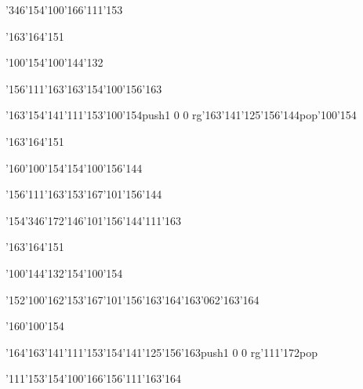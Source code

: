 \null\vfill\ipa\centerline{\enskip\enskip\enskip\enskip\enskip\enskip\enskip\enskip\enskip\enskip\enskip\enskip\enskip}\medskip\centerline{\enskip\char'346\enskip\char'154\char'100\char'166\enskip\enskip\enskip\enskip\enskip\enskip\char'111\char'153}\medskip\centerline{\enskip\enskip\enskip\char'163\char'164\char'151\enskip\enskip\enskip\enskip\enskip\enskip}\medskip\centerline{\enskip\char'100\char'154\enskip\char'100\char'144\char'132\enskip\enskip\enskip\enskip\enskip\enskip\enskip}\medskip\centerline{\enskip\char'156\char'111\char'163\enskip\enskip\enskip\enskip\enskip\enskip\enskip\char'163\char'154\char'100\char'156\char'163\enskip\enskip\enskip}\medskip\centerline{\enskip\enskip\enskip\enskip\enskip\enskip\enskip\enskip\enskip\enskip\enskip\enskip\enskip\enskip\enskip\enskip\enskip}\medskip\centerline{\enskip\char'163\char'154\char'141\char'111\char'153\enskip\char'100\char'154\enskip\pdfcolorstack\match push{1 0 0 rg}\char'163\char'141\char'125\char'156\char'144\pdfcolorstack\match pop{}\enskip\char'100\char'154}\medskip\centerline{\enskip\enskip\enskip\char'163\char'164\char'151\enskip\enskip\enskip\enskip\enskip\enskip}\medskip\centerline{\enskip\enskip\enskip\enskip\enskip\enskip\enskip\char'160\char'100\char'154\enskip\char'154\char'100\char'156\char'144}\medskip\vfill\footline{\hfil\tt\folio\hfil}\eject
\null\vfill\ipa\centerline{\enskip\enskip\enskip\enskip\char'156\char'111\char'163\enskip\char'153\char'167\char'101\char'156\char'144}\medskip\centerline{\enskip\enskip\enskip\char'154\char'346\char'172\enskip\char'146\char'101\char'156\char'144\enskip\char'111\char'163}\medskip\centerline{\enskip\enskip\enskip\char'163\char'164\char'151\enskip\enskip\enskip\enskip\enskip\enskip}\medskip\centerline{\enskip\enskip\enskip\enskip\char'100\char'144\char'132\enskip\enskip\enskip\enskip\char'154\char'100\char'154}\medskip\centerline{\enskip\char'152\char'100\char'162\enskip\char'153\char'167\char'101\char'156\char'163\enskip\char'164\char'163\char'062\char'163\char'164\enskip\enskip\enskip}\medskip\centerline{\enskip\enskip\enskip\enskip\enskip\enskip\enskip\enskip\enskip\enskip\enskip\char'160\char'100\char'154\enskip\enskip\enskip}\medskip\centerline{\enskip\char'164\char'163\char'141\char'111\char'153\enskip\enskip\enskip\enskip\char'154\char'141\char'125\char'156\char'163\enskip\pdfcolorstack\match push{1 0 0 rg}\char'111\char'172\pdfcolorstack\match pop{}}\medskip\centerline{\enskip\enskip\enskip\enskip\enskip\enskip\enskip\enskip\enskip\enskip\enskip\enskip}\medskip\centerline{\enskip\char'111\char'153\enskip\enskip\enskip\enskip\char'154\char'100\char'166\enskip\char'156\char'111\char'163\char'164}\medskip\vfill\footline{\hfil\tt\folio\hfil}\eject
